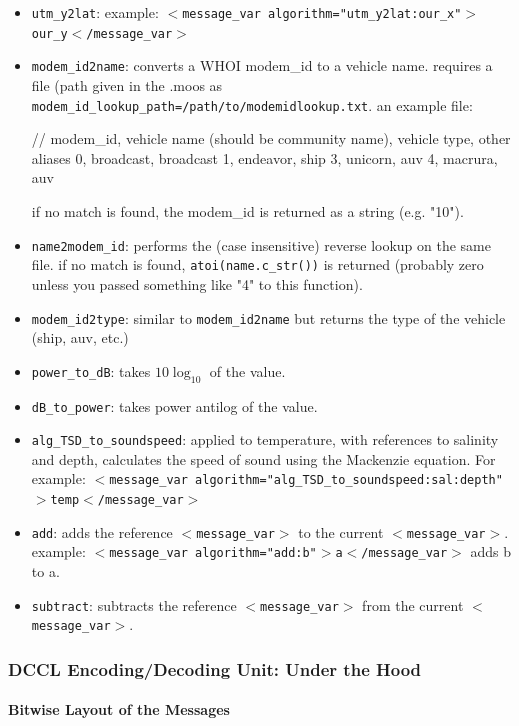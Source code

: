 \documentclass[11pt, letterpaper, oneside]{memoir}
\newcommand{\xmltag}[1]{\texttt{$<$#1$>$}}
\begin{document}
\begin{itemize}
\item \verb|utm_y2lat|: example: \xmltag{message\_var algorithm="utm\_y2lat:our\_x"$>$our\_y$<$/message\_var}
\item \verb|modem_id2name|: converts a WHOI modem\_id to a vehicle name. requires a file (path given in the .moos as \verb|modem_id_lookup_path=/path/to/modemidlookup.txt|. an example file:
\begin{boxedverbatim}
// modem_id, vehicle name (should be community name), vehicle type, other aliases
0, broadcast, broadcast
1, endeavor, ship
3, unicorn, auv
4, macrura, auv
\end{boxedverbatim}
\resetbvlinenumber
if no match is found, the modem\_id is returned as a string (e.g. "10").
\item \verb|name2modem_id|: performs the (case insensitive) reverse lookup on the same file. if no match is found, \verb|atoi(name.c_str())| is returned (probably zero unless you passed something like "4" to this function).
\item \verb|modem_id2type|: similar to \verb|modem_id2name| but returns the type of the vehicle (ship, auv, etc.)
\item \verb|power_to_dB|: takes $10\log_{10}$ of the value.
\item \verb|dB_to_power|: takes power antilog of the value.
\item \verb|alg_TSD_to_soundspeed|: applied to temperature, with references to salinity and depth, calculates the speed of sound using the Mackenzie equation. For example: \xmltag{message\_var algorithm="alg\_TSD\_to\_soundspeed:sal:depth"$>$temp$<$/message\_var}
\item \verb|add|: adds the reference \xmltag{message\_var} to the current \xmltag{message\_var}. example: \xmltag{message\_var algorithm="add:b"$>$a$<$/message\_var} adds b to a.
\item \verb|subtract|: subtracts the reference \xmltag{message\_var} from the current \xmltag{message\_var}.
\end{itemize}

\subsubsection{DCCL Encoding/Decoding Unit: Under the Hood}

\paragraph{Bitwise Layout of the Messages}
\end{document}
